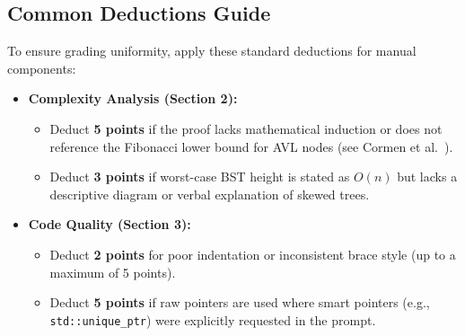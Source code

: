 \subsection{Common Deductions Guide}
To ensure grading uniformity, apply these standard deductions for manual components:
\begin{itemize}
    \item \textbf{Complexity Analysis (Section 2):}
    \begin{itemize}
        \item Deduct \textbf{5 points} if the proof lacks mathematical induction or does not reference the Fibonacci lower bound for AVL nodes (see Cormen et al.~\cite{cormen2022introduction}).
        \item Deduct \textbf{3 points} if worst-case BST height is stated as $O(n)$ but lacks a descriptive diagram or verbal explanation of skewed trees.
    \end{itemize}
    \item \textbf{Code Quality (Section 3):}
    \begin{itemize}
        \item Deduct \textbf{2 points} for poor indentation or inconsistent brace style (up to a maximum of 5 points).
        \item Deduct \textbf{5 points} if raw pointers are used where smart pointers (e.g., \texttt{std::unique\_ptr}) were explicitly requested in the prompt.
    \end{itemize}
\end{itemize}

